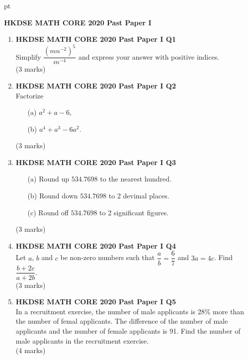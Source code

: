 \documentclass[12pt]{article}
\begin{document}
 pt
\begin{center}
	{\large \bf HKDSE MATH CORE 2020 Past Paper I}\\
	\vspace{2 mm}

\end{center}
\vspace{0.05cm}

\begin{enumerate}
	\item \textbf{HKDSE MATH CORE 2020 Past Paper I Q1}\\	
	Simplify $\dfrac{(mn^{-2})^5}{m^{-4}}$ and express your answer with positive indices. \\(3 marks)	

	\item \textbf{HKDSE MATH CORE 2020 Past Paper I Q2}\\
	Factorize
	\begin{enumerate}
		\item[(a)] $a^2 + a - 6$,
		\item[(b)] $a^4 + a^3 - 6a^2$.
	\end{enumerate}
	(3 marks)

	\item \textbf{HKDSE MATH CORE 2020 Past Paper I Q3}
	\begin{enumerate}
		\item[(a)] Round up $534.7698$ to the nearest hundred.
		\item[(b)] Round down $534.7698$ to 2 devimal places.
		\item[(c)] Round off $534.7698$ to 2 significant figures.
	\end{enumerate}
	(3 marks)

	\item \textbf{HKDSE MATH CORE 2020 Past Paper I Q4}\\
	Let $a$, $b$ and $c$ be non-zero numbers such that $\dfrac{a}{b} = \dfrac{6}{7}$ and $3a = 4c$. Find $\dfrac{b + 2c}{a + 2b}$. \\(3 marks)

	\item \textbf{HKDSE MATH CORE 2020 Past Paper I Q5}\\
	In a recruitment exercise, the number of male applicants is 28\% more than the number of femal applicants. The difference of the number of male applicants and the number of female applicants is 91. Find the number of male applicants in the recruitment exercise. \\(4 marks)


\end{enumerate}
\end{document}
